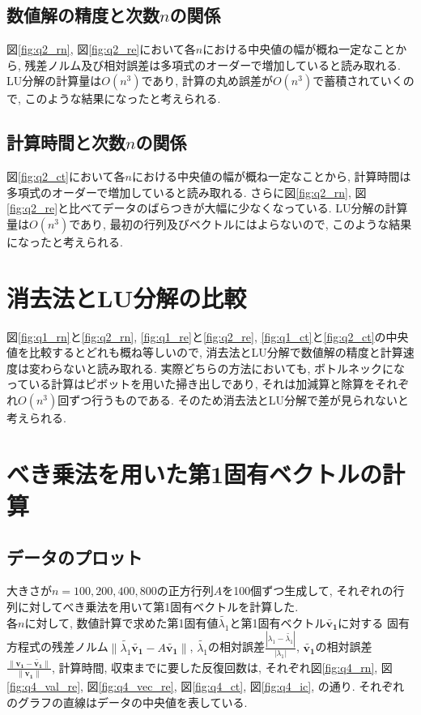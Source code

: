 \documentclass[uplatex,a4j]{jsarticle}
\begin{document}
\newpage
\subsection{数値解の精度と次数$n$の関係}
\label{sec:q2_2}
図\ref{fig:q2_rn}, 図\ref{fig:q2_re}において各$n$における中央値の幅が概ね一定なことから, 
残差ノルム及び相対誤差は多項式のオーダーで増加していると読み取れる. 
LU分解の計算量は$O(n^3)$であり, 計算の丸め誤差が$O(n^3)$で蓄積されていくので, このような結果になったと考えられる.

\subsection{計算時間と次数$n$の関係}
\label{sec:q2_3}
図\ref{fig:q2_ct}において各$n$における中央値の幅が概ね一定なことから, 
計算時間は多項式のオーダーで増加していると読み取れる. 
さらに図\ref{fig:q2_rn}, 図\ref{fig:q2_re}と比べてデータのばらつきが大幅に少なくなっている.
LU分解の計算量は$O(n^3)$であり, 最初の行列及びベクトルにはよらないので, このような結果になったと考えられる.


\section{消去法とLU分解の比較}
図\ref{fig:q1_rn}と\ref{fig:q2_rn}, \ref{fig:q1_re}と\ref{fig:q2_re}, 
\ref{fig:q1_ct}と\ref{fig:q2_ct}の中央値を比較するとどれも概ね等しいので, 
消去法とLU分解で数値解の精度と計算速度は変わらないと読み取れる. 
実際どちらの方法においても, ボトルネックになっている計算はピボットを用いた掃き出しであり, 
それは加減算と除算をそれぞれ$O(n^3)$回ずつ行うものである. 
そのため消去法とLU分解で差が見られないと考えられる. 

\section{べき乗法を用いた第1固有ベクトルの計算}
\label{sec:q4}

\subsection{データのプロット}
\label{sec:q4_1}
大きさが$n = 100,200,400,800$の正方行列$A$を100個ずつ生成して, 
それぞれの行列に対してべき乗法を用いて第1固有ベクトルを計算した. \\
各$n$に対して, 数値計算で求めた第1固有値$\tilde{\lambda_1}$と第1固有ベクトル$\bm{\tilde{v_1}}$に対する
固有方程式の残差ノルム$\| \tilde{\lambda_1}\bm{\tilde{v_1}} - A \bm{\tilde{v_1}} \|$, 
$\tilde{\lambda_1}$の相対誤差$\frac{|\lambda_1 - \tilde{\lambda_1}|}{|\lambda_1|}$, 
$\bm{\tilde{v_1}}$の相対誤差$\frac{\| \bm{v_1} - \bm{\tilde{v_1}} \|}{\| \bm{v_1} \|}$, 
計算時間, 収束までに要した反復回数は, 
それぞれ図\ref{fig:q4_rn}, 図\ref{fig:q4_val_re}, 図\ref{fig:q4_vec_re}, 図\ref{fig:q4_ct}, 図\ref{fig:q4_ic}, の通り. 
それぞれのグラフの直線はデータの中央値を表している.
\end{document}
